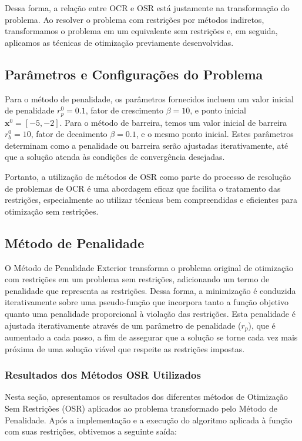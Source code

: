 \documentclass[a4paper, 12pt]{article}
\begin{document}
Dessa forma, a relação entre OCR e OSR está justamente na transformação do problema. Ao resolver o problema com restrições por métodos indiretos, transformamos o problema em um equivalente sem restrições e, em seguida, aplicamos as técnicas de otimização previamente desenvolvidas.\\

\subsection{Parâmetros e Configurações do Problema}
Para o método de penalidade, os parâmetros fornecidos incluem um valor inicial de penalidade $r_p^0 = 0.1$, fator de crescimento $\beta = 10$, e ponto inicial $\mathbf{x}^0 = [-5, -2]$. Para o método de barreira, temos um valor inicial de barreira $r_b^0 = 10$, fator de decaimento $\beta = 0.1$, e o mesmo ponto inicial. Estes parâmetros determinam como a penalidade ou barreira serão ajustadas iterativamente, até que a solução atenda às condições de convergência desejadas.

Portanto, a utilização de métodos de OSR como parte do processo de resolução de problemas de OCR é uma abordagem eficaz que facilita o tratamento das restrições, especialmente ao utilizar técnicas bem compreendidas e eficientes para otimização sem restrições.

\subsection{Método de Penalidade}

O Método de Penalidade Exterior transforma o problema original de otimização com restrições em um problema sem restrições, adicionando um termo de penalidade que representa as restrições. Dessa forma, a minimização é conduzida iterativamente sobre uma pseudo-função que incorpora tanto a função objetivo quanto uma penalidade proporcional à violação das restrições. Esta penalidade é ajustada iterativamente através de um parâmetro de penalidade ($r_p$), que é aumentado a cada passo, a fim de assegurar que a solução se torne cada vez mais próxima de uma solução viável que respeite as restrições impostas.

\subsubsection{Resultados dos Métodos OSR Utilizados}

Nesta seção, apresentamos os resultados dos diferentes métodos de Otimização Sem Restrições (OSR) aplicados ao problema transformado pelo Método de Penalidade. Após a implementação e a execução do algoritmo aplicada à função com suas restrições, obtivemos a seguinte saída:
\end{document}
